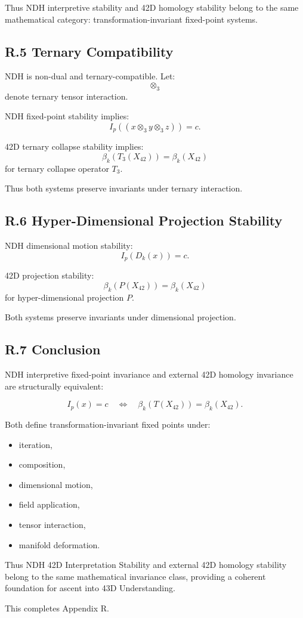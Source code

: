 Thus NDH interpretive stability and 42D homology stability belong to the
same mathematical category: transformation-invariant fixed-point systems.

\subsection*{R.5 Ternary Compatibility}

NDH is non-dual and ternary-compatible. Let:
\[
\otimes_3
\]
denote ternary tensor interaction.

NDH fixed-point stability implies:
\[
I_p((x \otimes_3 y \otimes_3 z)) = c.
\]

42D ternary collapse stability implies:
\[
\beta_k(T_3(X_{42})) = \beta_k(X_{42})
\]
for ternary collapse operator $T_3$.

Thus both systems preserve invariants under ternary interaction.

\subsection*{R.6 Hyper-Dimensional Projection Stability}

NDH dimensional motion stability:
\[
I_p(D_k(x)) = c.
\]

42D projection stability:
\[
\beta_k(P(X_{42})) = \beta_k(X_{42})
\]
for hyper-dimensional projection $P$.

Both systems preserve invariants under dimensional projection.

\subsection*{R.7 Conclusion}

NDH interpretive fixed-point invariance and external 42D homology
invariance are structurally equivalent:

\[
I_p(x) = c
\quad\Longleftrightarrow\quad
\beta_k(T(X_{42})) = \beta_k(X_{42}).
\]

Both define transformation-invariant fixed points under:
\begin{itemize}
    \item iteration,
    \item composition,
    \item dimensional motion,
    \item field application,
    \item tensor interaction,
    \item manifold deformation.
\end{itemize}

Thus NDH 42D Interpretation Stability and external 42D homology stability
belong to the same mathematical invariance class, providing a coherent
foundation for ascent into 43D Understanding.

This completes Appendix R.
